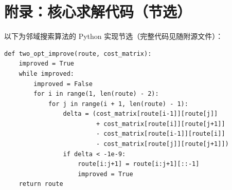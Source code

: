 \documentclass[zihao=-4,a4paper]{ctexart}
\begin{document}
\section*{附录：核心求解代码（节选）}

\quad 以下为邻域搜索算法的 Python 实现节选（完整代码见随附源文件）：

\begin{verbatim}
def two_opt_improve(route, cost_matrix):
    improved = True
    while improved:
        improved = False
        for i in range(1, len(route) - 2):
            for j in range(i + 1, len(route) - 1):
                delta = (cost_matrix[route[i-1]][route[j]]
                         + cost_matrix[route[i]][route[j+1]]
                         - cost_matrix[route[i-1]][route[i]]
                         - cost_matrix[route[j]][route[j+1]])
                if delta < -1e-9:
                    route[i:j+1] = route[i:j+1][::-1]
                    improved = True
    return route
\end{verbatim}
\end{document}
